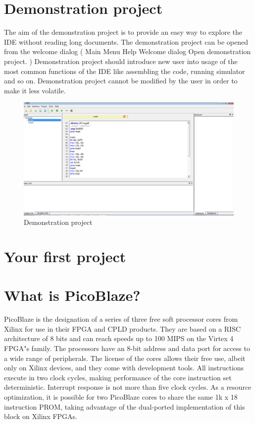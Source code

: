 
        \section{Demonstration project}
        The aim of the demonstration project is to provide an easy way to explore
        the IDE without reading long documents. The
        demonstration project can be opened from the welcome dialog ( Main Menu
        Help Welcome dialog Open demonstration project. )
        Demonstration project should introduce new user into usage of the most
        common functions of the IDE like assembling the code, running simulator
        and so on. Demonstration project cannot be modified by the user in order
        to make it less volatile.
                \begin{figure}
                    \centering{}
                    \includegraphics [scale=0.4]{img/Demonstration_project.png}
                    \caption{Demonstration project}
                \end{figure}
        \section{Your first project}

        \section{What is PicoBlaze?}
        PicoBlaze is the designation of a series of three free soft processor cores
        from Xilinx for use in their FPGA and CPLD products. They are based on a RISC
        architecture of 8 bits and can reach speeds up to 100 MIPS on the Virtex 4
        FPGA"s family. The processors have an 8-bit address and data port for access
        to a wide range of peripherals. The license of the cores allows their free
        use, albeit only on Xilinx devices, and they come with development tools.
        All instructions execute in two clock cycles, making performance of the core instruction
        set deterministic. Interrupt response is not more than five clock cycles. As a resource
        optimization, it is possible for two PicoBlaze cores to share the same 1k x 18 instruction
        PROM, taking advantage of the dual-ported implementation of this block on Xilinx FPGAs.

